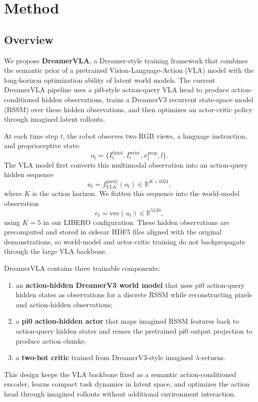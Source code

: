 \section{Method}

\subsection{Overview}

We propose \textbf{DreamerVLA}, a Dreamer-style training framework that combines the semantic prior of a pretrained Vision-Language-Action (VLA) model with the long-horizon optimization ability of latent world models. The current DreamerVLA pipeline uses a pi0-style action-query VLA head to produce action-conditioned hidden observations, trains a DreamerV3 recurrent state-space model (RSSM) over these hidden observations, and then optimizes an actor-critic policy through imagined latent rollouts.

At each time step $t$, the robot observes two RGB views, a language instruction, and proprioceptive state:
\[
o_t = \{I_t^{\text{third}}, I_t^{\text{wrist}}, x_t^{\text{prop}}, l\}.
\]
The VLA model first converts this multimodal observation into an action-query hidden sequence
\[
u_t = f_{\text{VLA}}^{\text{query}}(o_t) \in \mathbb{R}^{K \times 1024},
\]
where $K$ is the action horizon. We flatten this sequence into the world-model observation
\[
e_t = \mathrm{vec}(u_t) \in \mathbb{R}^{5120},
\]
using $K=5$ in our LIBERO configuration. These hidden observations are precomputed and stored in sidecar HDF5 files aligned with the original demonstrations, so world-model and actor-critic training do not backpropagate through the large VLA backbone.

DreamerVLA contains three trainable components:
\begin{enumerate}
    \item an \textbf{action-hidden DreamerV3 world model} that uses pi0 action-query hidden states as observations for a discrete RSSM while reconstructing pixels and action-hidden observations;
    \item a \textbf{pi0 action-hidden actor} that maps imagined RSSM features back to action-query hidden states and reuses the pretrained pi0 output projection to produce action chunks;
    \item a \textbf{two-hot critic} trained from DreamerV3-style imagined $\lambda$-returns.
\end{enumerate}

This design keeps the VLA backbone fixed as a semantic action-conditioned encoder, learns compact task dynamics in latent space, and optimizes the action head through imagined rollouts without additional environment interaction.

